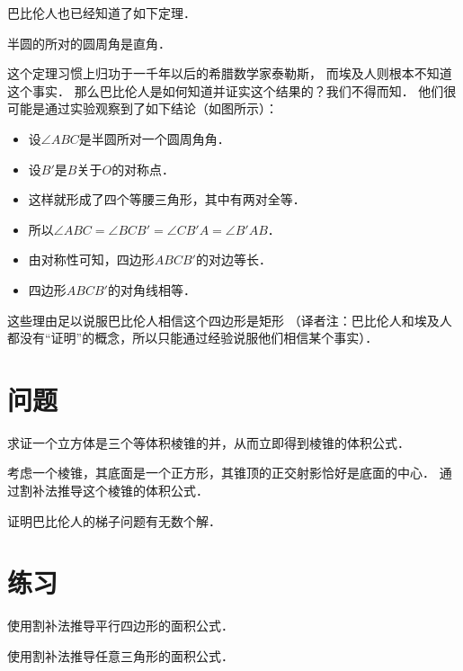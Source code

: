 \documentclass[cn,fancy,blue,11pt]{elegantbook}
\begin{document}
巴比伦人也已经知道了如下定理．
\begin{theorem*}{}{}
	半圆的所对的圆周角是直角．
\end{theorem*}

这个定理习惯上归功于一千年以后的希腊数学家泰勒斯，
而埃及人则根本不知道这个事实．
那么巴比伦人是如何知道并证实这个结果的？我们不得而知．
他们很可能是通过实验观察到了如下结论（如图所示）：
\begin{itemize}
	\item 设$\angle ABC$是半圆所对一个圆周角角．
	\item 设$B'$是$B$关于$O$的对称点．
	\item 这样就形成了四个等腰三角形，其中有两对全等．
	\item 所以$\angle ABC=\angle BCB'=\angle CB'A=\angle B'AB$．
	\item 由对称性可知，四边形$ABCB'$的对边等长．
	\item 四边形$ABCB'$的对角线相等．
\end{itemize}
这些理由足以说服巴比伦人相信这个四边形是矩形
（译者注：巴比伦人和埃及人都没有``证明''的概念，所以只能通过经验说服他们相信某个事实）．

\section{问题}

\begin{problem}
	求证一个立方体是三个等体积棱锥的并，从而立即得到棱锥的体积公式．
\end{problem}

\begin{problem}
	考虑一个棱锥，其底面是一个正方形，其锥顶的正交射影恰好是底面的中心．
	通过割补法推导这个棱锥的体积公式．
\end{problem}

\begin{problem}
	证明巴比伦人的梯子问题有无数个解．
\end{problem}

\section{练习}

\begin{exercise}
	使用割补法推导平行四边形的面积公式．
\end{exercise}

\begin{exercise}
	使用割补法推导任意三角形的面积公式．
\end{exercise}
\end{document}
